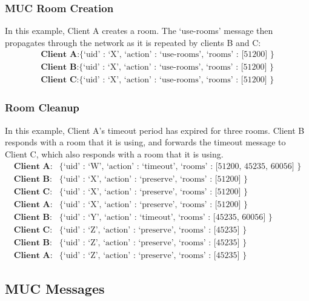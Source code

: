 \documentclass{article}
\begin{document}
\subsubsection{MUC Room Creation}

In this example, Client A creates a room. The `use-rooms' message then
propagates through the network as it is repeated by clients B and C:
\begin{align*}
\textbf{Client A}: \text{\{ `uid' : `X', `action' : `use-rooms', `rooms' :
[51200] \}}\\
\textbf{Client B}: \text{\{ `uid' : `X', `action' : `use-rooms', `rooms' :
[51200] \}}\\
\textbf{Client C}: \text{\{ `uid' : `X', `action' : `use-rooms', `rooms' :
[51200] \}}
\end{align*}

\subsubsection{Room Cleanup}

In this example, Client A's timeout period has expired for three rooms. Client B
responds with a room that it is using, and forwards the timeout message to
Client C, which also responds with a room that it is using.
\begin{align*}
\textbf{Client A}:& \text{\{ `uid' : `W', `action' : `timeout', `rooms' : [51200,
45235, 60056] \}}\\
\textbf{Client B}:& \text{\{ `uid' : `X', `action' : `preserve', `rooms' :
[51200] \}}\\
\textbf{Client C}:& \text{\{ `uid' : `X', `action' : `preserve', `rooms' :
[51200] \}}\\
\textbf{Client A}:& \text{\{ `uid' : `X', `action' : `preserve', `rooms' :
[51200] \}}\\
\textbf{Client B}:& \text{\{ `uid' : `Y', `action' : `timeout', `rooms' : [45235,
60056] \}}\\
\textbf{Client C}:& \text{\{ `uid' : `Z', `action' : `preserve', `rooms' :
[45235] \}}\\
\textbf{Client B}:& \text{\{ `uid' : `Z', `action' : `preserve', `rooms' :
[45235] \}}\\
\textbf{Client A}:& \text{\{ `uid' : `Z', `action' : `preserve', `rooms' :
[45235] \}}
\end{align*}

\subsection{MUC Messages}
\end{document}
